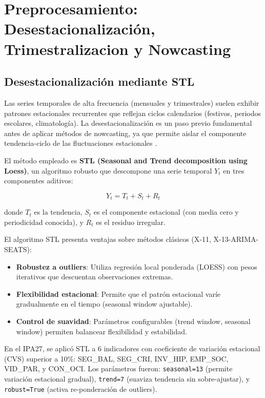 \documentclass[authoryear,12pt]{elsarticle}
\begin{document}
\section{Preprocesamiento: Desestacionalización, Trimestralizacion y Nowcasting}

\subsection{Desestacionalización mediante STL}

Las series temporales de alta frecuencia (mensuales y trimestrales) suelen exhibir patrones estacionales recurrentes que reflejan ciclos calendarios (festivos, periodos escolares, climatología). La desestacionalización es un paso previo fundamental antes de aplicar métodos de nowcasting, ya que permite aislar el componente tendencia-ciclo de las fluctuaciones estacionales \citep{cleveland1990stl}.

El método empleado es \textbf{STL (Seasonal and Trend decomposition using Loess)}, un algoritmo robusto que descompone una serie temporal $Y_t$ en tres componentes aditivos:

\begin{equation}
Y_t = T_t + S_t + R_t
\end{equation}

donde $T_t$ es la tendencia, $S_t$ es el componente estacional (con media cero y periodicidad conocida), y $R_t$ es el residuo irregular.

El algoritmo STL presenta ventajas sobre métodos clásicos (X-11, X-13-ARIMA-SEATS):
\begin{itemize}
    \item \textbf{Robustez a outliers}: Utiliza regresión local ponderada (LOESS) con pesos iterativos que descuentan observaciones extremas.
    \item \textbf{Flexibilidad estacional}: Permite que el patrón estacional varíe gradualmente en el tiempo (seasonal window ajustable).
    \item \textbf{Control de suavidad}: Parámetros configurables (trend window, seasonal window) permiten balancear flexibilidad y estabilidad.
\end{itemize}

En el IPA27, se aplicó STL a 6 indicadores con coeficiente de variación estacional (CVS) superior a 10\%: SEG\_BAL, SEG\_CRI, INV\_HIP, EMP\_SOC, VID\_PAR, y CON\_OCI. Los parámetros fueron: \texttt{seasonal=13} (permite variación estacional gradual), \texttt{trend=7} (suaviza tendencia sin sobre-ajustar), y \texttt{robust=True} (activa re-ponderación de outliers).
\end{document}

